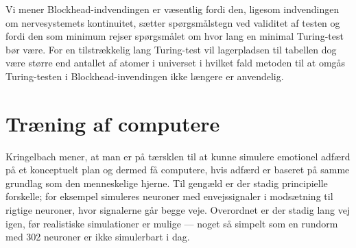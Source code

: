\documentclass{article}
\begin{document}
Vi mener Blockhead-indvendingen er væsentlig fordi den, ligesom indvendingen om nervesystemets kontinuitet, sætter spørgsmålstegn ved validitet af testen og fordi den som minimum rejser spørgsmålet om hvor lang en minimal Turing-test bør være. For en tilstrækkelig lang Turing-test vil lagerpladsen til tabellen dog være større end antallet af atomer i universet i hvilket fald metoden til at omgås Turing-testen i Blockhead-invendingen ikke længere er anvendelig.

\section{Træning af computere}
Kringelbach mener, at man er på tærsklen til at kunne simulere emotionel adfærd på et konceptuelt plan og dermed få computere, hvis adfærd er baseret på samme grundlag som den menneskelige hjerne. Til gengæld er der stadig principielle forskelle; for eksempel simuleres neuroner med envejssignaler i modsætning til rigtige neuroner, hvor signalerne går begge veje. Overordnet er der stadig lang vej igen, før realistiske simulationer er mulige --- noget så simpelt som en rundorm med 302 neuroner er ikke simulerbart i dag.
\end{document}

